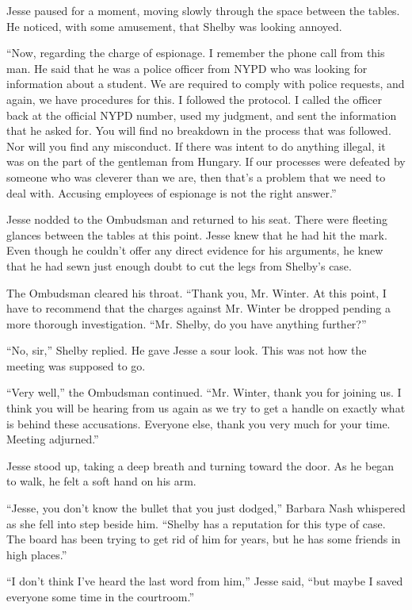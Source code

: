 \documentclass[12pt]{book}
\begin{document}
Jesse paused for a moment, moving slowly through the space between the tables.  He noticed, with some amusement, that Shelby was looking annoyed.

``Now, regarding the charge of espionage.  I remember the phone call from this man.  He said that he was a police officer from NYPD who was looking for information about a student.  We are required to comply with police requests, and again, we have procedures for this.  I followed the protocol.  I called the officer back at the official NYPD number, used my judgment, and sent the information that he asked for.  You will find no breakdown in the process that was followed.  Nor will you find any misconduct.  If there was intent to do anything illegal, it was on the part of the gentleman from Hungary.  If our processes were defeated by someone who was cleverer than we are, then that's a problem that we need to deal with.  Accusing employees of espionage is not the right answer.''

Jesse nodded to the Ombudsman and returned to his seat.  There were fleeting glances between the tables at this point.  Jesse knew that he had hit the mark.  Even though he couldn't offer any direct evidence for his arguments, he knew that he had sewn just enough doubt to cut the legs from Shelby's case.

The Ombudsman cleared his throat.  ``Thank you, Mr. Winter.  At this point, I have to recommend that the charges against Mr. Winter be dropped pending a more thorough investigation.  ``Mr. Shelby, do you have anything further?''

``No, sir,'' Shelby replied.  He gave Jesse a sour look.  This was not how the meeting was supposed to go.

``Very well,'' the Ombudsman continued.  ``Mr. Winter, thank you for joining us.  I think you will be hearing from us again as we try to get a handle on exactly what is behind these accusations.  Everyone else, thank you very much for your time.  Meeting adjurned.''

Jesse stood up, taking a deep breath and turning toward the door.  As he began to walk, he felt a soft hand on his arm.

``Jesse, you don't know the bullet that you just dodged,'' Barbara Nash whispered as she fell into step beside him.  ``Shelby has a reputation for this type of case.  The board has been trying to get rid of him for years, but he has some friends in high places.''

``I don't think I've heard the last word from him,'' Jesse said, ``but maybe I saved everyone some time in the courtroom.''
\end{document}
